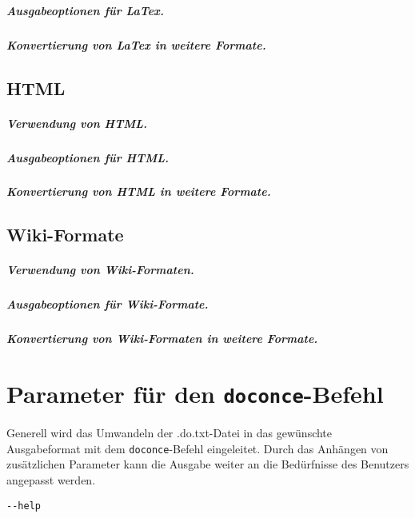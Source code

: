 \documentclass[%
oneside,                 %
final,                   %
chapterprefix=true,      %
open=right,              %
10pt]{book}
\begin{document}
\paragraph{ Ausgabeoptionen für LaTex.}
\paragraph{ Konvertierung von LaTex in weitere Formate.}
\section{HTML}
\paragraph{ Verwendung von HTML.}
\paragraph{ Ausgabeoptionen für HTML.}
\paragraph{ Konvertierung von HTML in weitere Formate.}
\section{Wiki-Formate}
\paragraph{ Verwendung von Wiki-Formaten.}
\paragraph{ Ausgabeoptionen für Wiki-Formate.}
\paragraph{ Konvertierung von Wiki-Formaten in weitere Formate.}
\chapter{Parameter für den \texttt{doconce}-Befehl}
Generell wird das Umwandeln der \*.do.txt-Datei in das gewünschte Ausgabeformat mit dem \texttt{doconce}-Befehl eingeleitet. Durch das Anhängen von zusätzlichen Parameter kann die Ausgabe weiter an die Bedürfnisse des Benutzers angepasst werden.

\begin{verbatim}
--help
\end{verbatim}
\end{document}
